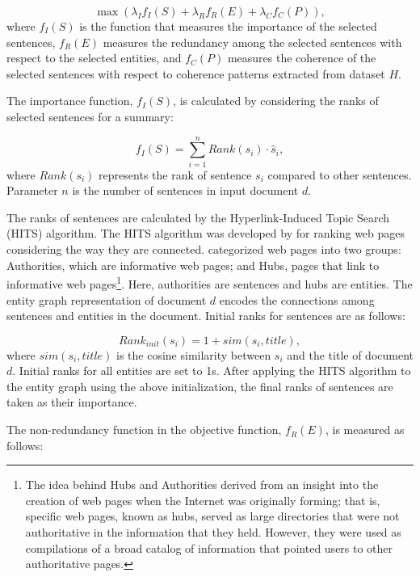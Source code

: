 \begin{equation}
\max(\lambda_I f_I(S) + \lambda_R f_R(E) + \lambda_C f_C(P)),
\end{equation}
where $f_I(S)$ is the function that measures the importance of the selected sentences, $f_R(E)$ measures the redundancy among the selected sentences with respect to the selected entities, and $f_C(P)$ measures the coherence of the selected sentences with respect to coherence patterns extracted from dataset $H$. 

The importance function, $f_I(S)$, is calculated by considering the ranks of selected sentences for a summary:

\begin{equation}
f_I(S) = \sum_{i=1}^{n}{Rank(s_i) \cdot \hat{s}_i},
\end{equation}
where $Rank(s_i)$ represents the rank of sentence $s_i$ compared to other sentences. 
Parameter $n$ is the number of sentences in input document $d$.  

The ranks of sentences are calculated by the \mbox{Hyperlink-Induced} Topic Search (HITS) algorithm.
The HITS algorithm was developed by  for ranking web pages considering the way they are connected.  
 categorized web pages into two groups:  Authorities, which are informative web pages; and Hubs, pages that link to informative web pages\footnote{The idea behind Hubs and Authorities derived from an insight into the creation of web pages when the Internet was originally forming;  that is, specific web pages, known as hubs, served as large directories that were not authoritative in the information that they held.  However, they were used as compilations of a broad catalog of information that pointed users to other authoritative pages.}.
Here, authorities are sentences and hubs are entities.  
The entity graph representation of document $d$ encodes the connections among sentences and entities in the document. 
Initial ranks for sentences are as follows: 

\begin{equation}
Rank_{init}(s_i)= 1 + sim (s_i, title),
\end{equation}
where $sim(s_i, title)$ is the cosine similarity between $s_i$ and the title of document $d$. 
Initial ranks for all entities are set to 1s. 
After applying the HITS algorithm to the entity graph using the above initialization, the final ranks of sentences are taken as their importance. 

The non-redundancy function in the objective function, $f_R(E)$,    
is measured as follows:

